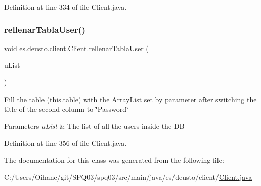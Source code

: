 Definition at line 334 of file Client.\+java.

\mbox{\label{classes_1_1deusto_1_1client_1_1_client_a8c6076e43a37a66a27a00f458eeab3de}} 
\subsubsection{\texorpdfstring{rellenar\+Tabla\+User()}{rellenarTablaUser()}}
{\footnotesize\ttfamily void es.\+deusto.\+client.\+Client.\+rellenar\+Tabla\+User (\begin{DoxyParamCaption}\item[{Array\+List$<$ \hyperlink{classes_1_1deusto_1_1server_1_1db_1_1data_1_1_user}{User} $>$}]{u\+List }\end{DoxyParamCaption})}

Fill the table (this.\+table) with the Array\+List set by parameter after switching the title of the second column to \char`\"{}\+Password\char`\"{} 
\begin{DoxyParams}{Parameters}
{\em u\+List} & The list of all the users inside the DB \\
\hline
\end{DoxyParams}


Definition at line 356 of file Client.\+java.



The documentation for this class was generated from the following file\+:\begin{DoxyCompactItemize}
\item 
C\+:/\+Users/\+Oihane/git/\+S\+P\+Q03/spq03/src/main/java/es/deusto/client/\hyperlink{_client_8java}{Client.\+java}\end{DoxyCompactItemize}
